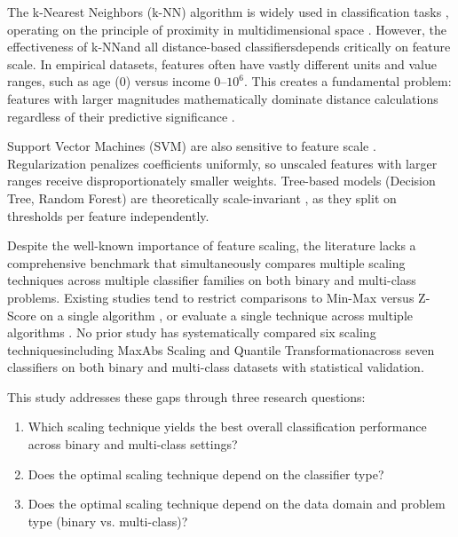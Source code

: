 \documentclass[12pt,a4paper]{article}
\begin{document}
The k-Nearest Neighbors (k-NN) algorithm is widely used in classification tasks \cite{cunningham2021knn,halder2024knn}, operating on the principle of proximity in multidimensional space \cite{bakri2025knn,sultana2022knn}. However, the effectiveness of k-NN\textemdash and all distance-based classifiers\textemdash depends critically on feature scale. In empirical datasets, features often have vastly different units and value ranges, such as age (0) versus income $0$--$10^6$. This creates a fundamental problem: features with larger magnitudes mathematically dominate distance calculations regardless of their predictive significance \cite{mutoffar2025ml,cetin2024distance,pagan2023scaling}.

Support Vector Machines (SVM) are also sensitive to feature scale \cite{guido2024svm,pinheiro2025scaling}. Regularization penalizes coefficients uniformly, so unscaled features with larger ranges receive disproportionately smaller weights. Tree-based models (Decision Tree, Random Forest) are theoretically scale-invariant \cite{ahsan2021scaling}, as they split on thresholds per feature independently.

Despite the well-known importance of feature scaling, the literature lacks a comprehensive benchmark that simultaneously compares multiple scaling techniques across multiple classifier families on both binary and multi-class problems. Existing studies tend to restrict comparisons to Min-Max versus Z-Score on a single algorithm \cite{henderi2021minmax,manurung2025knn}, or evaluate a single technique across multiple algorithms \cite{pagan2023scaling}. No prior study has systematically compared six scaling techniques\textemdash including MaxAbs Scaling and Quantile Transformation\textemdash across seven classifiers on both binary and multi-class datasets with statistical validation.

This study addresses these gaps through three research questions:

\begin{enumerate}
  \item[\textbf{RQ1:}] Which scaling technique yields the best overall classification performance across binary and multi-class settings?
  \item[\textbf{RQ2:}] Does the optimal scaling technique depend on the classifier type?
  \item[\textbf{RQ3:}] Does the optimal scaling technique depend on the data domain and problem type (binary vs. multi-class)?
\end{enumerate}
\end{document}
